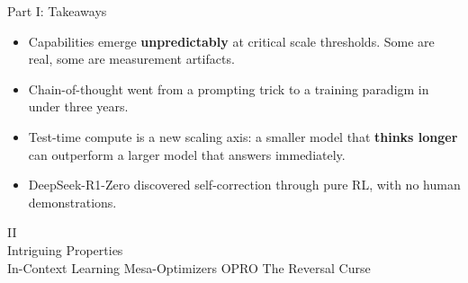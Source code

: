 \documentclass[aspectratio=169, 12pt]{beamer}
\begin{document}
\begin{frame}{Part I: Takeaways}
  \begin{itemize}
    \setlength\itemsep{12pt}
    \item Capabilities emerge \textbf{unpredictably} at critical scale
          thresholds. Some are real, some are measurement artifacts.
    \item Chain-of-thought went from a prompting trick to a training
          paradigm in under three years.
    \item Test-time compute is a new scaling axis: a smaller model that
          \textbf{thinks longer} can outperform a larger model that
          answers immediately.
    \item DeepSeek-R1-Zero discovered self-correction through pure RL,
          with no human demonstrations.
  \end{itemize}
\end{frame}



\begin{frame}[standout]
  \Huge II\\[12pt]
  \Large Intriguing Properties\\[6pt]
  \normalsize In-Context Learning \;\textbullet\;
    Mesa-Optimizers \;\textbullet\; OPRO \;\textbullet\; The Reversal Curse
\end{frame}
\end{document}
